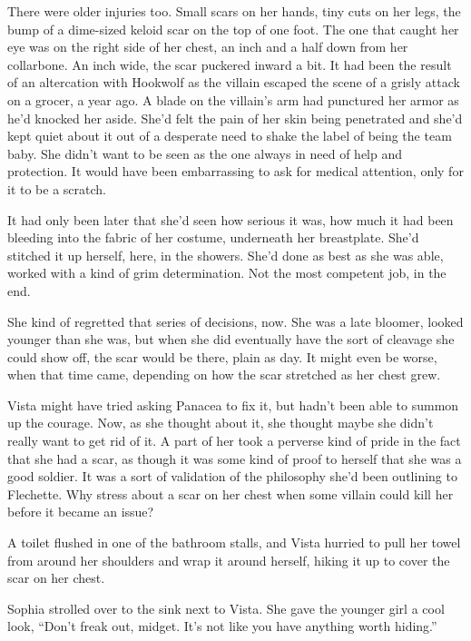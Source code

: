 There were older injuries too.  Small scars on her hands, tiny cuts on her legs, the bump of a dime-sized keloid scar on the top of one foot.  The one that caught her eye was on the right side of her chest, an inch and a half down from her collarbone.  An inch wide, the scar puckered inward a bit.  It had been the result of an altercation with Hookwolf as the villain escaped the scene of a grisly attack on a grocer, a year ago.  A blade on the villain's arm had punctured her armor as he'd knocked her aside.  She'd felt the pain of her skin being penetrated and she'd kept quiet about it out of a desperate need to shake the label of being the team baby.  She didn't want to be seen as the one always in need of help and protection.  It would have been embarrassing to ask for medical attention, only for it to be a scratch.



It had only been later that she'd seen how serious it was, how much it had been bleeding into the fabric of her costume, underneath her breastplate. She'd stitched it up herself, here, in the showers.  She'd done as best as she was able, worked with a kind of grim determination.  Not the most competent job, in the end.



She kind of regretted that series of decisions, now.  She was a late bloomer, looked younger than she was, but when she did eventually have the sort of cleavage she could show off, the scar would be there, plain as day.  It might even be worse, when that time came, depending on how the scar stretched as her chest grew.



Vista might have tried asking Panacea to fix it, but hadn't been able to summon up the courage.  Now, as she thought about it, she thought maybe she didn't really want to get rid of it.  A part of her took a perverse kind of pride in the fact that she had a scar, as though it was some kind of proof to herself that she was a good soldier.  It was a sort of validation of the philosophy she'd been outlining to Flechette.  Why stress about a scar on her chest when some villain could kill her before it became an issue?



A toilet flushed in one of the bathroom stalls, and Vista hurried to pull her towel from around her shoulders and wrap it around herself, hiking it up to cover the scar on her chest.



Sophia strolled over to the sink next to Vista.  She gave the younger girl a cool look, ``Don't freak out, midget.  It's not like you have anything worth hiding.''



